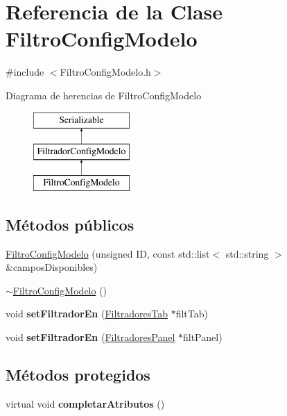 \hypertarget{classFiltroConfigModelo}{\section{\-Referencia de la \-Clase \-Filtro\-Config\-Modelo}
\label{classFiltroConfigModelo}
}


{\ttfamily \#include $<$\-Filtro\-Config\-Modelo.\-h$>$}

\-Diagrama de herencias de \-Filtro\-Config\-Modelo\begin{figure}[H]
\begin{center}
\leavevmode
\includegraphics[height=3.000000cm]{classFiltroConfigModelo}
\end{center}
\end{figure}
\subsection*{\-Métodos públicos}
\begin{DoxyCompactItemize}
\item 
\hyperlink{classFiltroConfigModelo_a345f0b72d16ac7b1d971aa18fac11717}{\-Filtro\-Config\-Modelo} (unsigned \-I\-D, const std\-::list$<$ std\-::string $>$ \&campos\-Disponibles)
\item 
\hyperlink{classFiltroConfigModelo_aa0e4383974a930a58f57e5faa92cd845}{$\sim$\-Filtro\-Config\-Modelo} ()
\item 
\hypertarget{classFiltroConfigModelo_a54769347060eeb20fb25137921d7ad36}{void {\bfseries set\-Filtrador\-En} (\hyperlink{classFiltradoresTab}{\-Filtradores\-Tab} $\ast$filt\-Tab)}\label{classFiltroConfigModelo_a54769347060eeb20fb25137921d7ad36}

\item 
\hypertarget{classFiltroConfigModelo_a4cd680914e9fbd4a4d6d66ce6f97ac6b}{void {\bfseries set\-Filtrador\-En} (\hyperlink{classFiltradoresPanel}{\-Filtradores\-Panel} $\ast$filt\-Panel)}\label{classFiltroConfigModelo_a4cd680914e9fbd4a4d6d66ce6f97ac6b}

\end{DoxyCompactItemize}
\subsection*{\-Métodos protegidos}
\begin{DoxyCompactItemize}
\item 
\hypertarget{classFiltroConfigModelo_aa4835820b733580a4f7694f535d89842}{virtual void {\bfseries completar\-Atributos} ()}\label{classFiltroConfigModelo_aa4835820b733580a4f7694f535d89842}

\end{DoxyCompactItemize}


